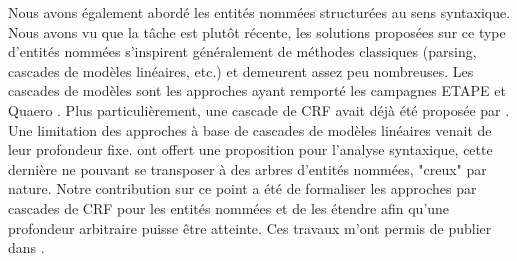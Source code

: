 \documentclass[12pt,a4paper,times,twoside,openright]{report}
\begin{document}
Nous avons également abordé les entités nommées structurées au sens syntaxique. Nous avons vu que la tâche est plutôt récente, les solutions proposées sur ce type d'entités nommées s'inspirent généralement de méthodes classiques (parsing, cascades de modèles linéaires, etc.) et demeurent assez peu nombreuses. Les cascades de modèles sont les approches ayant remporté les campagnes ETAPE et Quaero \citep{dinarelli2012,raymond2013robust}. Plus particulièrement, une cascade de CRF avait déjà été proposée par \citet{raymond2013robust}. Une limitation des approches à base de cascades de modèles linéaires venait de leur profondeur fixe. \citet{Tsuruoka09} ont offert une proposition pour l'analyse syntaxique, cette dernière ne pouvant se transposer à des arbres d'entités nommées, "creux" par nature. Notre contribution sur ce point a été de formaliser les approches par cascades de CRF pour les entités nommées et de les étendre afin qu'une profondeur arbitraire puisse être atteinte. Ces travaux m'ont permis de publier dans \citet{dupont2017b}.
\end{document}
